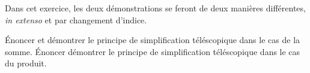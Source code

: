 %
%
	Dans cet exercice, les deux démonstrations se feront de deux manières différentes, \textit{in extenso} et par changement d'indice.
	\begin{tasks}
		\task Énoncer et démontrer le principe de simplification téléscopique dans le cas de la somme.
		\task  Énoncer démontrer le principe de simplification téléscopique dans le cas du produit.
	\end{tasks}
